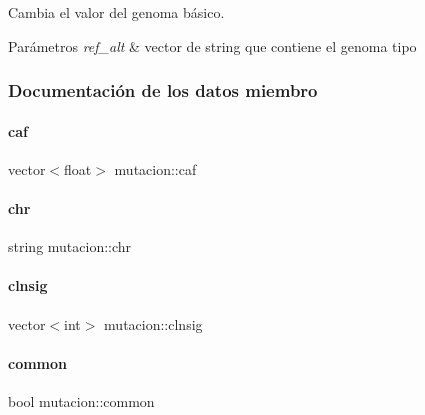 Cambia el valor del genoma básico. 


\begin{DoxyParams}{Parámetros}
{\em ref\+\_\+alt} & vector de string que contiene el genoma tipo \\
\hline
\end{DoxyParams}


\subsubsection{Documentación de los datos miembro}
\hypertarget{classmutacion_aeb2ac56009900d9319873d00ee80e090}{}\label{classmutacion_aeb2ac56009900d9319873d00ee80e090} 
\paragraph{\texorpdfstring{caf}{caf}}
{\footnotesize\ttfamily vector$<$float$>$ mutacion\+::caf\hspace{0.3cm}{\ttfamily [private]}}

\hypertarget{classmutacion_a57651966b952f782240ff9cff72c5d2f}{}\label{classmutacion_a57651966b952f782240ff9cff72c5d2f} 
\paragraph{\texorpdfstring{chr}{chr}}
{\footnotesize\ttfamily string mutacion\+::chr\hspace{0.3cm}{\ttfamily [private]}}

\hypertarget{classmutacion_adc0290c4a6db7f4c7341b0183c7ef534}{}\label{classmutacion_adc0290c4a6db7f4c7341b0183c7ef534} 
\paragraph{\texorpdfstring{clnsig}{clnsig}}
{\footnotesize\ttfamily vector$<$int$>$ mutacion\+::clnsig\hspace{0.3cm}{\ttfamily [private]}}

\hypertarget{classmutacion_a6dabfef6167d64030f095887b15f65dd}{}\label{classmutacion_a6dabfef6167d64030f095887b15f65dd} 
\paragraph{\texorpdfstring{common}{common}}
{\footnotesize\ttfamily bool mutacion\+::common\hspace{0.3cm}{\ttfamily [private]}}

